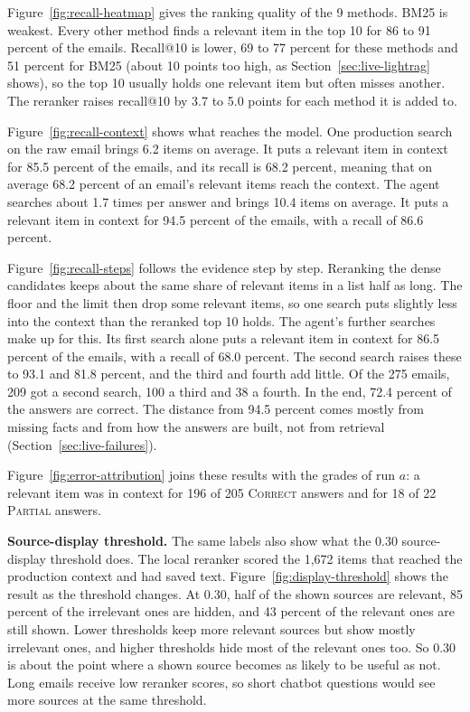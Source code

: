 

Figure~\ref{fig:recall-heatmap} gives the ranking quality of the 9 methods. BM25 is weakest. Every other method finds a relevant item in the top 10 for 86 to 91 percent of the emails. Recall@10 is lower, 69 to 77 percent for these methods and 51 percent for BM25 (about 10 points too high, as Section~\ref{sec:live-lightrag} shows), so the top 10 usually holds one relevant item but often misses another. The reranker raises recall@10 by 3.7 to 5.0 points for each method it is added to.



Figure~\ref{fig:recall-context} shows what reaches the model. One production search on the raw email brings 6.2 items on average. It puts a relevant item in context for 85.5 percent of the emails, and its recall is 68.2 percent, meaning that on average 68.2 percent of an email's relevant items reach the context. The agent searches about 1.7 times per answer and brings 10.4 items on average. It puts a relevant item in context for 94.5 percent of the emails, with a recall of 86.6 percent.



Figure~\ref{fig:recall-steps} follows the evidence step by step. Reranking the dense candidates keeps about the same share of relevant items in a list half as long. The floor and the limit then drop some relevant items, so one search puts slightly less into the context than the reranked top 10 holds. The agent's further searches make up for this. Its first search alone puts a relevant item in context for 86.5 percent of the emails, with a recall of 68.0 percent. The second search raises these to 93.1 and 81.8 percent, and the third and fourth add little. Of the 275 emails, 209 got a second search, 100 a third and 38 a fourth. In the end, 72.4 percent of the answers are correct. The distance from 94.5 percent comes mostly from missing facts and from how the answers are built, not from retrieval (Section~\ref{sec:live-failures}).



Figure~\ref{fig:error-attribution} joins these results with the grades of run $a$: a relevant item was in context for 196 of 205 \textsc{Correct} answers and for 18 of 22 \textsc{Partial} answers.

\textbf{Source-display threshold.} The same labels also show what the 0.30 source-display threshold does. The local reranker scored the 1,672 items that reached the production context and had saved text. Figure~\ref{fig:display-threshold} shows the result as the threshold changes. At 0.30, half of the shown sources are relevant, 85 percent of the irrelevant ones are hidden, and 43 percent of the relevant ones are still shown. Lower thresholds keep more relevant sources but show mostly irrelevant ones, and higher thresholds hide most of the relevant ones too. So 0.30 is about the point where a shown source becomes as likely to be useful as not. Long emails receive low reranker scores, so short chatbot questions would see more sources at the same threshold.

